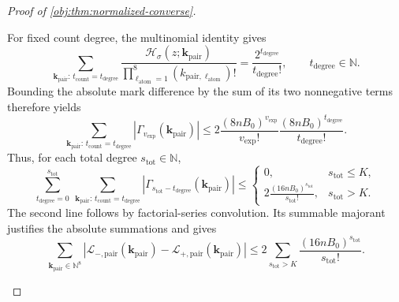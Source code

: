 \begin{proof}[Proof of \cref{obj:thm:normalized-converse}]
\begin{enumerate}
For fixed count degree, the multinomial identity gives
\[
\sum_{\boldsymbol{k}_{\mathrm{pair}}:\,
      t_{\mathrm{count}}=t_{\mathrm{degree}}}
\frac{\mathcal H_\sigma(z;\boldsymbol{k}_{\mathrm{pair}})}
     {\prod_{\ell_{\mathrm{atom}}=1}^{8}
       (k_{\mathrm{pair},\ell_{\mathrm{atom}}})!}
=\frac{2^{t_{\mathrm{degree}}}}{t_{\mathrm{degree}}!},
\qquad t_{\mathrm{degree}}\in\mathbb N.
\]
Bounding the absolute mark difference by the sum of its two nonnegative terms therefore yields
\[
\sum_{\boldsymbol{k}_{\mathrm{pair}}:\,
      t_{\mathrm{count}}=t_{\mathrm{degree}}}
|\Gamma_{v_{\mathrm{exp}}}(\boldsymbol{k}_{\mathrm{pair}})|
\le
2\frac{(8nB_0)^{v_{\mathrm{exp}}}}{v_{\mathrm{exp}}!}
 \frac{(8nB_0)^{t_{\mathrm{degree}}}}{t_{\mathrm{degree}}!}.
\]
Thus, for each total degree \(s_{\mathrm{tot}}\in\mathbb N\),
\[
\sum_{t_{\mathrm{degree}}=0}^{s_{\mathrm{tot}}}
\ \sum_{\boldsymbol{k}_{\mathrm{pair}}:\,
      t_{\mathrm{count}}=t_{\mathrm{degree}}}
|\Gamma_{s_{\mathrm{tot}}-t_{\mathrm{degree}}}(\boldsymbol{k}_{\mathrm{pair}})|
\le
\begin{cases}
0,&s_{\mathrm{tot}}\le K,\\[2mm]
\displaystyle
2\frac{(16nB_0)^{s_{\mathrm{tot}}}}{s_{\mathrm{tot}}!},
&s_{\mathrm{tot}}>K.
\end{cases}
\]
The second line follows by factorial-series convolution. Its summable majorant justifies the absolute summations and gives
\[
\sum_{\boldsymbol{k}_{\mathrm{pair}}\in\mathbb N^8}
\left|
\mathcal L_{-,\mathrm{pair}}(\boldsymbol{k}_{\mathrm{pair}})
-\mathcal L_{+,\mathrm{pair}}(\boldsymbol{k}_{\mathrm{pair}})
\right|
\le
2\sum_{s_{\mathrm{tot}}>K}
\frac{(16nB_0)^{s_{\mathrm{tot}}}}{s_{\mathrm{tot}}!}.
\]


\end{enumerate}
\end{proof}
